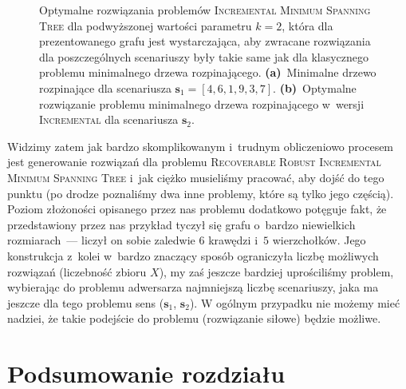 \begin{figure}[!h]
\begin{subfigure}[b]{0.3\textwidth}
		\caption{}
		\label{fig:robincrexampleopt:b}
	\end{subfigure}
	\hfill\null
	\caption{
		Optymalne rozwiązania problemów \textsc{Incremental Minimum Spanning Tree} dla podwyższonej wartości parametru $k = 2$, która dla prezentowanego grafu jest wystarczająca, aby zwracane rozwiązania dla poszczególnych scenariuszy były takie same jak dla klasycznego problemu minimalnego drzewa rozpinającego.
		\textbf{(a)}~Minimalne drzewo rozpinające dla scenariusza $\textbf{s}_{1} = \left[ 4, 6, 1, 9, 3, 7 \right]$.
		\textbf{(b)}~Optymalne rozwiązanie problemu minimalnego drzewa rozpinającego w~wersji \textsc{Incremental} dla scenariusza $\textbf{s}_{2}$.
	}
	\label{fig:robincrexampleopt}
\end{figure}

Widzimy zatem jak bardzo skomplikowanym i~trudnym obliczeniowo procesem jest generowanie rozwiązań dla problemu \textsc{Recoverable Robust Incremental Minimum Spanning Tree} i~jak ciężko musieliśmy pracować, aby dojść do tego punktu (po drodze poznaliśmy dwa inne problemy, które są tylko jego częścią).
Poziom złożoności opisanego przez nas problemu dodatkowo potęguje fakt, że przedstawiony przez nas przykład tyczył się grafu o~bardzo niewielkich rozmiarach~--- liczył on sobie zaledwie $6$ krawędzi i~$5$ wierzchołków.
Jego konstrukcja z~kolei w~bardzo znaczący sposób ograniczyła liczbę możliwych rozwiązań (liczebność zbioru $X$), my zaś jeszcze bardziej uprościliśmy problem, wybierając do problemu adwersarza najmniejszą liczbę scenariuszy, jaka ma jeszcze dla tego problemu sens ($\textbf{s}_{1}$, $\textbf{s}_{2}$).
W ogólnym przypadku nie możemy mieć nadziei, że takie podejście do problemu (rozwiązanie siłowe) będzie możliwe.




\section{Podsumowanie rozdziału}




